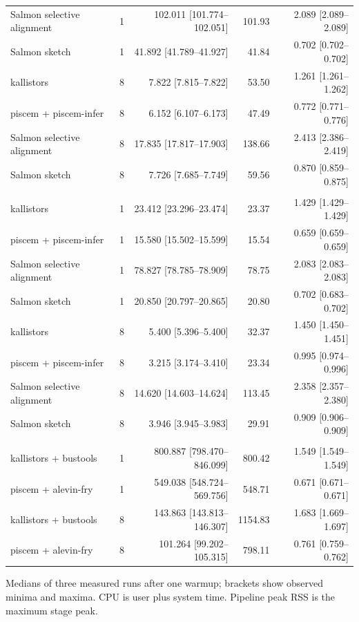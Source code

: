 \begin{longtable}{@{}lrrrr@{}}
Salmon selective alignment & 1 & 102.011 [101.774--102.051] & 101.93 & 2.089 [2.089--2.089] \\
Salmon sketch & 1 & 41.892 [41.789--41.927] & 41.84 & 0.702 [0.702--0.702] \\
kallistors & 8 & 7.822 [7.815--7.822] & 53.50 & 1.261 [1.261--1.262] \\
piscem + piscem-infer & 8 & 6.152 [6.107--6.173] & 47.49 & 0.772 [0.771--0.776] \\
Salmon selective alignment & 8 & 17.835 [17.817--17.903] & 138.66 & 2.413 [2.386--2.419] \\
Salmon sketch & 8 & 7.726 [7.685--7.749] & 59.56 & 0.870 [0.859--0.875] \\
\addlinespace
\multicolumn{5}{@{}l}{\textit{fragment-truth-se}} \\
kallistors & 1 & 23.412 [23.296--23.474] & 23.37 & 1.429 [1.429--1.429] \\
piscem + piscem-infer & 1 & 15.580 [15.502--15.599] & 15.54 & 0.659 [0.659--0.659] \\
Salmon selective alignment & 1 & 78.827 [78.785--78.909] & 78.75 & 2.083 [2.083--2.083] \\
Salmon sketch & 1 & 20.850 [20.797--20.865] & 20.80 & 0.702 [0.683--0.702] \\
kallistors & 8 & 5.400 [5.396--5.400] & 32.37 & 1.450 [1.450--1.451] \\
piscem + piscem-infer & 8 & 3.215 [3.174--3.410] & 23.34 & 0.995 [0.974--0.996] \\
Salmon selective alignment & 8 & 14.620 [14.603--14.624] & 113.45 & 2.358 [2.357--2.380] \\
Salmon sketch & 8 & 3.946 [3.945--3.983] & 29.91 & 0.909 [0.906--0.909] \\
\addlinespace
\multicolumn{5}{@{}l}{\textit{pbmc\_1k\_v3}} \\
kallistors + bustools & 1 & 800.887 [798.470--846.099] & 800.42 & 1.549 [1.549--1.549] \\
piscem + alevin-fry & 1 & 549.038 [548.724--569.756] & 548.71 & 0.671 [0.671--0.671] \\
kallistors + bustools & 8 & 143.863 [143.813--146.307] & 1154.83 & 1.683 [1.669--1.697] \\
piscem + alevin-fry & 8 & 101.264 [99.202--105.315] & 798.11 & 0.761 [0.759--0.762] \\
\end{longtable}
\noindent\footnotesize Medians of three measured runs after one warmup; brackets show observed minima and maxima. CPU is user plus system time. Pipeline peak RSS is the maximum stage peak.
\endgroup
